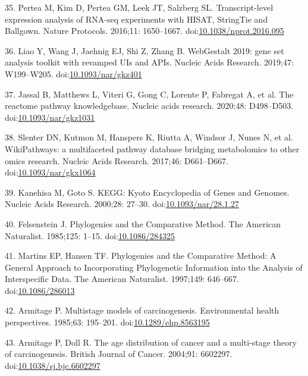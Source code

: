 \documentclass[]{elsarticle} %
\begin{document}
\leavevmode\hypertarget{ref-Tuxedo}{}%
35. Pertea M, Kim D, Pertea GM, Leek JT, Salzberg SL. Transcript-level
expression analysis of RNA-seq experiments with HISAT, StringTie and
Ballgown. Nature Protocols. 2016;11: 1650--1667.
doi:\href{https://doi.org/10.1038/nprot.2016.095}{10.1038/nprot.2016.095}

\leavevmode\hypertarget{ref-WebGestalt2019}{}%
36. Liao Y, Wang J, Jaehnig EJ, Shi Z, Zhang B. WebGestalt 2019: gene
set analysis toolkit with revamped UIs and APIs. Nucleic Acids Research.
2019;47: W199--W205.
doi:\href{https://doi.org/10.1093/nar/gkz401}{10.1093/nar/gkz401}

\leavevmode\hypertarget{ref-Reactome}{}%
37. Jassal B, Matthews L, Viteri G, Gong C, Lorente P, Fabregat A, et
al. The reactome pathway knowledgebase. Nucleic acids research. 2020;48:
D498--D503.
doi:\href{https://doi.org/10.1093/nar/gkz1031}{10.1093/nar/gkz1031}

\leavevmode\hypertarget{ref-Wikipathways}{}%
38. Slenter DN, Kutmon M, Hanspers K, Riutta A, Windsor J, Nunes N, et
al. WikiPathways: a multifaceted pathway database bridging metabolomics
to other omics research. Nucleic Acids Research. 2017;46: D661--D667.
doi:\href{https://doi.org/10.1093/nar/gkx1064}{10.1093/nar/gkx1064}

\leavevmode\hypertarget{ref-KEGG}{}%
39. Kanehisa M, Goto S. KEGG: Kyoto Encyclopedia of Genes and Genomes.
Nucleic Acids Research. 2000;28: 27--30.
doi:\href{https://doi.org/10.1093/nar/28.1.27}{10.1093/nar/28.1.27}

\leavevmode\hypertarget{ref-Felsenstein1985}{}%
40. Felsenstein J. Phylogenies and the Comparative Method. The American
Naturalist. 1985;125: 1--15.
doi:\href{https://doi.org/10.1086/284325}{10.1086/284325}

\leavevmode\hypertarget{ref-MartinsAndHansen1997}{}%
41. Martins EP, Hansen TF. Phylogenies and the Comparative Method: A
General Approach to Incorporating Phylogenetic Information into the
Analysis of Interspecific Data. The American Naturalist. 1997;149:
646--667. doi:\href{https://doi.org/10.1086/286013}{10.1086/286013}

\leavevmode\hypertarget{ref-Armitage:19851c2}{}%
42. Armitage P. Multistage models of carcinogenesis. Environmental
health perspectives. 1985;63: 195--201.
doi:\href{https://doi.org/10.1289/ehp.8563195}{10.1289/ehp.8563195}

\leavevmode\hypertarget{ref-Armitage:20041c2}{}%
43. Armitage P, Doll R. The age distribution of cancer and a multi-stage
theory of carcinogenesis. British Journal of Cancer. 2004;91: 6602297.
doi:\href{https://doi.org/10.1038/sj.bjc.6602297}{10.1038/sj.bjc.6602297}
\end{document}
